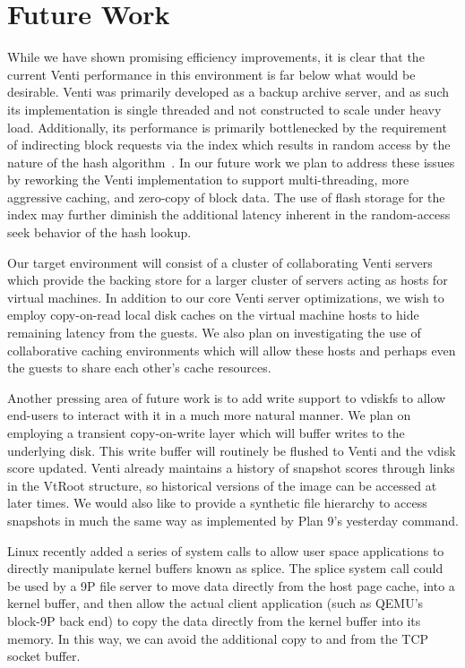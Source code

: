 \section{Future Work}

While we have shown promising efficiency improvements, it is clear that the
current Venti performance in this environment is far below what would be
desirable.
Venti was primarily developed as a backup archive server, and as such its
implementation is single threaded and not constructed to scale under
heavy load.
Additionally, its performance is primarily bottlenecked by the requirement
of indirecting block requests via the index which results in random access
by the nature of the hash algorithm~\cite{memventi}.
In our future work we plan to address these issues by reworking the Venti
implementation to support multi-threading, more aggressive caching, and
zero-copy of block data.
The use of flash storage for the index may further diminish the additional
latency inherent in the random-access seek behavior of the hash lookup.

Our target environment will consist of a cluster of collaborating 
Venti servers which provide the backing store for a 
larger cluster of servers acting as hosts for virtual machines.  
In addition to our core Venti server optimizations, we wish to employ
copy-on-read local disk caches on the virtual machine hosts to hide 
remaining latency from the guests.
We also plan on investigating the use of collaborative caching environments
which will allow these hosts and perhaps even the guests to share each other's 
cache resources.

Another pressing area of future work is to add write support to vdiskfs to
allow end-users to interact with it in a much more natural manner.
We plan on employing a transient copy-on-write layer which will buffer
writes to the underlying disk.  
This write buffer will routinely be flushed to Venti and the vdisk score
updated.
Venti already maintains a history of snapshot scores through links in the 
VtRoot structure, so historical versions of the image can be accessed at later
times.
We would also like to provide a synthetic file hierarchy to access snapshots
in much the same way as implemented by Plan 9's yesterday command.

Linux recently added a series of system calls to allow user space applications 
to directly manipulate kernel buffers known as splice.  
The splice system call could be used by a 9P file server to move data 
directly from the host page cache, into a kernel buffer, and then allow 
the actual client application (such as QEMU's block-9P back end) to copy the 
data directly from the kernel buffer into its memory.  
In this way, we can avoid the additional copy to and from the TCP socket buffer.

